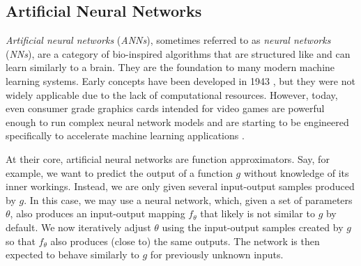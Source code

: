 \subsection{Artificial Neural Networks}
\textit{Artificial neural networks} (\textit{ANNs}), sometimes referred to as \textit{neural networks} (\textit{NNs}), are a category of bio-inspired algorithms that are structured like and can learn similarly to a brain. They are the foundation to many modern machine learning systems. Early concepts have been developed in 1943 \cite{first-neuron}, but they were not widely applicable due to the lack of computational resources. However, today, even consumer grade graphics cards intended for video games are powerful enough to run complex neural network models and are starting to be engineered specifically to accelerate machine learning applications \cite{tensor-cores}.

At their core, artificial neural networks are function approximators. Say, for example, we want to predict the output of a function $g$ without knowledge of its inner workings. Instead, we are only given several input-output samples produced by $g$. In this case, we may use a neural network, which, given a set of parameters $\theta$, also produces an input-output mapping $f_\theta$ that likely is not similar to $g$ by default. We now iteratively adjust $\theta$ using the input-output samples created by $g$ so that $f_\theta$ also produces (close to) the same outputs. The network is then expected to behave similarly to $g$ for previously unknown inputs.

